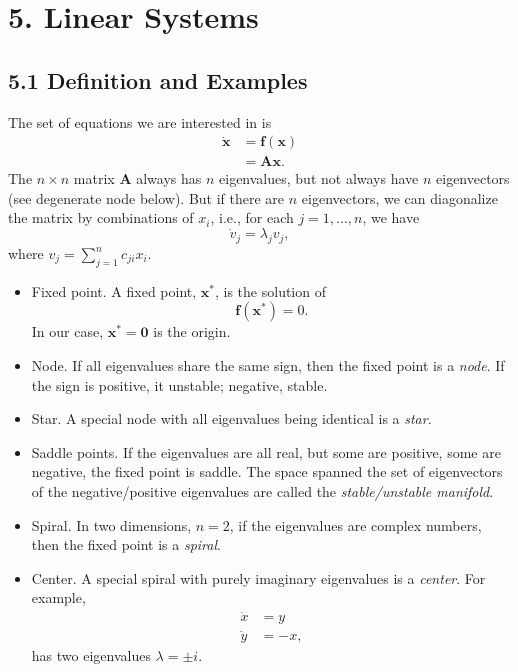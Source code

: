 \documentclass{book}
\begin{document}
\chapter{5. Linear Systems}

\section{5.1 Definition and Examples}

The set of equations we are interested in is
$$
\begin{aligned}
  \mathbf {\dot x}
  &= \mathbf f(\mathbf x) \\
  &= \mathbf A \mathbf x.
\end{aligned}
$$
The $n\times n$ matrix $\mathbf A$ always has $n$ eigenvalues,
but not always have $n$ eigenvectors (see degenerate node below).
But if there are $n$ eigenvectors,
we can diagonalize the matrix by combinations of $x_i$,
i.e., for each $j = 1, \dots, n$, we have
$$
\dot v_j = \lambda_j v_j,
$$
where $v_j = \sum_{j = 1}^n c_{ji} x_i$.

\begin{itemize}

\item
Fixed point. A fixed point, $\mathbf x^*$, is the solution of
$$
\mathbf f(\mathbf x^*) = 0.
$$
In our case, $\mathbf x^* = \mathbf 0$ is the origin.

\item
Node.
If all eigenvalues share the same sign, then the fixed point is a \emph{node}.
If the sign is positive, it unstable; negative, stable.

\item
Star.
A special node with all eigenvalues being identical is a \emph{star}.

\item
Saddle points.
If the eigenvalues are all real, but some are positive, some are negative, the fixed point is saddle.
The space spanned the set of eigenvectors of the negative/positive eigenvalues are called the \emph{stable/unstable manifold}.

\item
Spiral.
In two dimensions, $n = 2$,
if the eigenvalues are complex numbers, then the fixed point is a \emph{spiral}.

\item
Center.
A special spiral with purely imaginary eigenvalues is a \emph{center}. For example,
\begin{align*}
  \dot x &= y \\
  \dot y &= -x,
\end{align*}
has two eigenvalues $\lambda = \pm i$.

\end{itemize}
\end{document}
